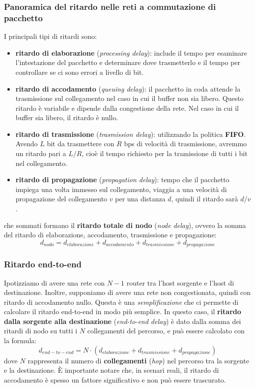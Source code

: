 \subsubsection{Panoramica del ritardo nelle reti a commutazione di pacchetto}
I principali tipi di ritardi sono:
\begin{itemize}
  \item \textbf{ritardo di elaborazione} (\textit{processing delay}): include il tempo per esaminare l'intestazione del pacchetto e determinare dove trasmetterlo e il tempo per controllare se ci sono errori a livello di bit.  
  \item \textbf{ritardo di accodamento} (\textit{queuing delay}): il pacchetto in coda attende la trasmissione sul collegamento nel caso in cui il buffer non sia libero. Questo ritardo è variabile e dipende dalla congestione della rete. Nel caso in cui il buffer sia libero, il ritardo è nullo.
  \item \textbf{ritardo di trasmissione} (\textit{trasmission delay}): utilizzando la politica \textbf{FIFO}. Avendo $L$ bit da trasmettere con $R$ bps di velocità di trasmissione, avremmo un ritardo pari a $L/R$, cioè il tempo richiesto per la tramissione di tutti i bit nel collegamento. 
  \item \textbf{ritardo di propagazione} (\textit{propagation delay}): tempo che il pacchetto impiega una volta immesso sul collegamento, viaggia a una velocità di propagazione del collegamento $v$ per una distanza $d$, quindi il ritardo sarà $d/v$.  
\end{itemize}
che sommati formano il \textbf{ritardo totale di nodo} (\textit{node delay}), ovvero la somma del ritardo di elaborazione, accodamento, trasmissione e propagazione:
\[
  d_{nodo} = d_{elaborazione} + d_{accodamento} + d_{trasmissione} + d_{propagazione} 
\]

\subsubsection{Ritardo end-to-end}
Ipotizziamo di avere una rete con $N - 1$ router tra l'host sorgente e l'host di destinazione. Inoltre, supponiamo di avere una rete non congestionata, quindi con ritardo di accodamento nullo. Questa è una \textit{semplificazione} che ci permette di calcolare il ritardo end-to-end in modo più semplice. In questo caso, il \textbf{ritardo dalla sorgente alla destinazione} (\textit{end-to-end delay}) è dato dalla somma dei ritardi di nodo su tutti i $N$ collegamenti del percorso, e può essere calcolato con la formula:
\[
  d_{end-to-end} = N \cdot (d_{elaborazione} + d_{trasmissione} + d_{propagazione})
\]
dove $N$ rappresenta il numero di \textbf{collegamenti} (\textit{hop}) nel percorso tra la sorgente e la destinazione. È importante notare che, in scenari reali, il ritardo di accodamento è spesso un fattore significativo e non può essere trascurato.

